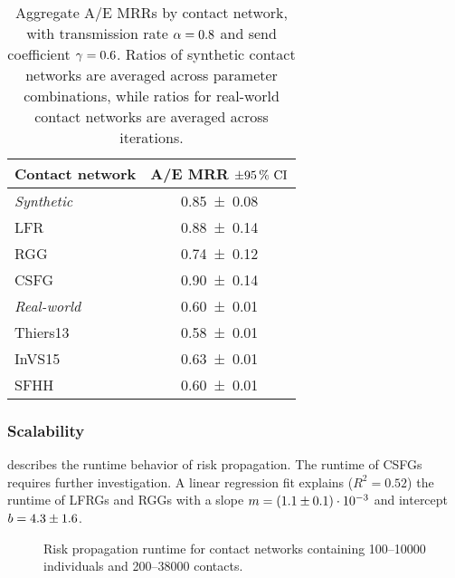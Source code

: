 \begin{table}[htbp]
\centering
\begin{tabular}{lS}
  \toprule
  Contact network & {A/E MRR $\qty{\pm 95}{\percent} \text{ CI}$}\\
  \midrule
  \textit{Synthetic} & \num{0.85 \pm 0.08}\\
  \tabindent LFR & \num{0.88 \pm 0.14}\\
  \tabindent RGG & \num{0.74 \pm 0.12}\\
  \tabindent CSFG & \num{0.90 \pm 0.14}\\
  \midrule
  \textit{Real-world} & \num{0.60 \pm 0.01}\\
  \tabindent Thiers13 & \num{0.58 \pm 0.01}\\
  \tabindent InVS15 & \num{0.63 \pm 0.01}\\
  \tabindent SFHH & \num{0.60 \pm 0.01}\\
  \bottomrule
\end{tabular}
\caption[Aggregate A/E MRRs by contact network]{Aggregate A/E MRRs by contact network, with transmission rate $\alpha = \num{0.8}$ and send coefficient $\gamma = \num{0.6}$. Ratios of synthetic contact networks are averaged across parameter combinations, while ratios for real-world contact networks are averaged across iterations.}
\label{tab:reachability}
\end{table}

\subsubsection{Scalability}

 describes the runtime behavior of risk propagation. The runtime of CSFGs requires further investigation. A linear regression fit explains ($R^2 = \num{0.52}$) the runtime of LFRGs and RGGs with a slope $m = \num[exponent-mode=scientific]{0.0011 \pm 0.0001}$ and intercept $b = \num{4.3 \pm 1.6}$.

\begin{figure}[htbp]
\centering
{}
\caption[Risk propagation runtime]{Risk propagation runtime for contact networks containing \numrange{100}{10000} individuals and \numrange{200}{38000} contacts.}
\label{fig:runtime}
\end{figure}

